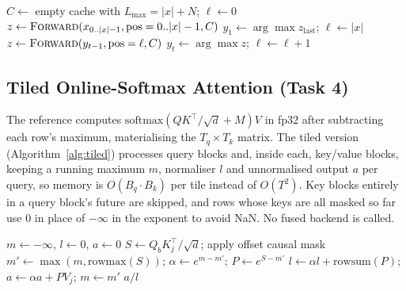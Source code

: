 \documentclass[conference]{IEEEtran}
\begin{document}
\begin{algorithm}[t]
\caption{Greedy decoding with an explicit KV cache}\label{alg:kv}
\small
\begin{algorithmic}[1]
\State $C \gets$ empty cache with $L_{\max}=|x|+N$; $\ell\gets0$
\State $z \gets \textsc{Forward}(x_{0..|x|-1}, \text{pos}=0..|x|-1, C)$ 
\State $y_1 \gets \arg\max z_{\text{last}}$; $\ell \gets |x|$
  \State $z \gets \textsc{Forward}(y_{t-1}, \text{pos}=\ell, C)$ 
  \State $y_t \gets \arg\max z$; $\ell \gets \ell+1$
\EndFor
\end{algorithmic}
\end{algorithm}

\subsection{Tiled Online-Softmax Attention (Task 4)}
The reference computes $\mathrm{softmax}(QK^\top/\sqrt{d}+M)V$ in fp32 after subtracting each row's maximum, materialising the $T_q\times T_k$ matrix. The tiled version (Algorithm~\ref{alg:tiled}) processes query blocks and, inside each, key/value blocks, keeping a running maximum $m$, normaliser $l$ and unnormalised output $a$ per query, so memory is $O(B_q\cdot B_k)$ per tile instead of $O(T^2)$. Key blocks entirely in a query block's future are skipped, and rows whose keys are all masked so far use 0 in place of $-\infty$ in the exponent to avoid NaN. No fused backend is called.

\begin{algorithm}[t]
\caption{Tiled attention with online softmax (one query block)}\label{alg:tiled}
\small
\begin{algorithmic}[1]
\State $m\gets-\infty$, $l\gets0$, $a\gets0$ 
  \State $S \gets Q_b K_j^\top/\sqrt{d}$; apply offset causal mask
  \State $m' \gets \max(m, \text{rowmax}(S))$; $\alpha\gets e^{m-m'}$; $P\gets e^{S-m'}$
  \State $l \gets \alpha l + \text{rowsum}(P)$; $a \gets \alpha a + P V_j$; $m\gets m'$
\EndFor
\State \Return $a / l$
\end{algorithmic}
\end{algorithm}
\end{document}
